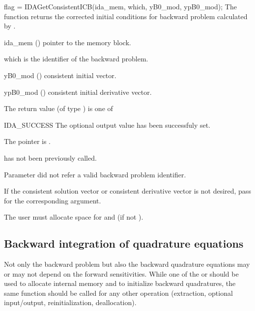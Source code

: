 {
  flag = IDAGetConsistentICB(ida\_mem, which, yB0\_mod, ypB0\_mod);
}
{
  The function  returns the corrected initial conditions
  for backward problem calculated by .
}
{
  \begin{args}
  \item[ida\_mem] ()
    pointer to the {\idas} memory block.
  \item[which]
    is the identifier of the backward problem.
  \item[yB0\_mod] ()
    consistent initial vector.
  \item[ypB0\_mod] ()
    consistent initial derivative vector.
  \end{args}
}
{
  The return value  (of type ) is one of
  \begin{args}
  \item[IDA\_SUCCESS] 
    The optional output value has been successfuly set.
  \item[\Id{IDA\_MEM\_NULL}]
    The  pointer is .
  \item[\Id{IDA\_NO\_ADJ}]
     has not been previously called.
  \item[\Id{IDA\_ILL\_INPUT}]
    Parameter  did not refer a valid backward problem identifier.
  \end{args}
}
{
  If the consistent solution vector or consistent derivative vector
  is not desired, pass  for the corresponding argument.

  {\warn} The user must allocate space for  and 
  (if not ).
}

\subsection{Backward integration of quadrature equations}

Not only the backward problem but also the backward quadrature equations 
may or may not depend on the forward sensitivities. While one of the 
 or  should be used to allocate internal 
memory and to initialize backward quadratures, the same function should be 
called for any other operation (extraction, optional input/output, 
reinitialization, deallocation).


